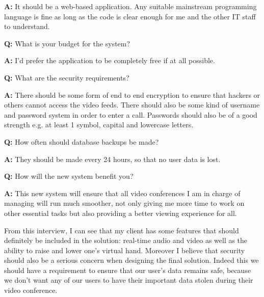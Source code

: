 \begin{tcolorbox}[
  boxrule=0pt, frame empty, colback=lightestgray, arc=0pt,
  breakable, colframe=white
]
  \textbf{A:} It should be a web-based application. Any 
  suitable mainstream programming language is fine as long as 
  the code is clear enough for me and the other IT staff to 
  understand.
  \vspace{0.25cm}

  \textbf{Q:} What is your budget for the system?
  \vspace{0.05cm}

  \textbf{A:} I'd prefer the application to be completely free
  if at all possible. \vspace{0.25cm}

  \textbf{Q:} What are the security requirements?
  \vspace{0.05cm}

  \textbf{A:} There should be some form of end to end 
  encryption to ensure that hackers or others cannot access the
  video feeds. There should also be some kind of username and 
  password system in order to enter a call. Passwords should 
  also be of a good strength e.g. at least 1 symbol, capital
  and lowercase letters.
  \vspace{0.25cm}

  \textbf{Q:} How often should database backups be made?
  \vspace{0.05cm}

  \textbf{A:} They should be made every 24 hours, so that no 
  user data is lost.
  \vspace{0.25cm}


  \textbf{Q:} How will the new system benefit you? 
  \vspace{0.05cm}

  \textbf{A:} This new system will ensure that all video 
  conferences I am in charge of managing will run much 
  smoother, not only giving me more time to work on other 
  essential tasks but also providing a better viewing
  experience for all.

\end{tcolorbox}

From this interview, I can see that my client has some features
that should definitely be included in the solution: real-time 
audio and video as well as the ability to raise and lower one's
virtual hand. Moreover I believe that security should also 
be a serious concern when designing the final solution. Indeed
this we should have a requirement to ensure that our user's data 
remains safe, because we don't want any of our users
to have their important data stolen during their video
conference. \vspace{0.2cm}

